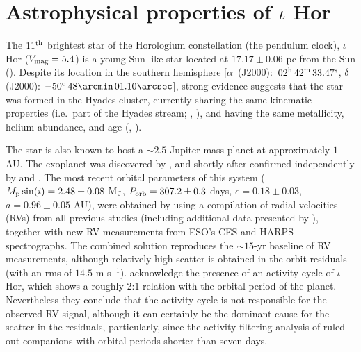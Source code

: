 \documentclass[a4paper,fleqn,usenatbib]{mnras}
\begin{document}
\section{Astrophysical properties of $\iota$ Hor}\label{sect_2}

The $11^{\rm th}$ brightest star of the Horologium constellation (the pendulum clock), $\iota$ Hor ($V_{\rm mag} = 5.4$) is a young Sun-like star located at $17.17 \pm 0.06$ pc from the Sun (). Despite its location in the southern hemisphere [$\alpha$~(J2000):~$02^{\rm h}\,42^{\rm m} \,33.47^{\rm s}$, $\delta$ (J2000): $-50^\circ \,48\arcmin\,01.10\arcsec$], strong evidence suggests that the star was formed in the Hyades cluster, currently sharing the same kinematic properties (i.e.~part of the Hyades stream; , ), and having the same metallicity, helium abundance, and age (, ). 

The star is also known to host a $\sim$$2.5$ Jupiter-mass planet at approximately $1$ AU. The exoplanet was discovered by , and shortly after confirmed independently by  and . The most recent orbital parameters of this system ($M_{\rm p}\sin(i) = 2.48 \pm 0.08$ M$_{\rm J}$, $P_{\rm orb} = 307.2 \pm 0.3$ days, $e = 0.18 \pm 0.03$, $a = 0.96 \pm 0.05$ AU), were obtained by  using a compilation of radial velocities (RVs) from all previous studies (including additional data presented by ), together with new RV measurements from ESO's CES and HARPS spectrographs. The combined solution reproduces the $\sim$$15$-yr baseline of RV measurements, although relatively high scatter is obtained in the orbit residuals (with an rms of $14.5$ m s$^{-1}$).  acknowledge the presence of an activity cycle of $\iota$ Hor, which shows a roughly $2$:$1$ relation with the orbital period of the planet. Nevertheless they conclude that the activity cycle is not responsible for the observed RV signal, although it can certainly be the dominant cause for the scatter in the residuals, particularly, since the activity-filtering analysis of  ruled out companions with orbital periods shorter than seven days.      
 
\end{document}
